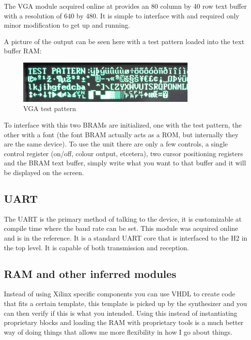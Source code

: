 \documentclass	[a4paper, 10pt]	{article}
\begin{document}
    The VGA module acquired online at \cite{vgacore} provides an 80 column by 40 row text buffer with
    a resolution of 640 by 480. It is simple to interface with and required only minor modification
    to get up and running.

    A picture of the output can be seen here with a test pattern loaded into the text buffer RAM:

      \begin{figure}[ht]
        \centering
        \includegraphics[width=0.8\textwidth]{pic/vga.png}
        \caption{VGA test pattern}
        \label{fig:VGA test pattern}
      \end{figure}
      \FloatBarrier

    To interface with this two BRAMs are initialized, one with the test pattern, the other with
    a font (the font BRAM actually acts as a ROM, but internally they are the same device). To
    use the unit there are only a few controls, a single control register (on/off, colour output,
    etcetera), two cursor positioning registers and the BRAM text buffer, simply write what you
    want to that buffer and it will be displayed on the screen.


    \subsection{UART}

      The UART is the primary method of talking to the device, it is customizable at
      compile time where the baud rate can be set. This module was acquired online
      and is in the reference\cite{uartcore}. It is a standard UART core that is
      interfaced to the H2 in the top level. It is capable of both transmission and
      reception.

    \subsection{RAM and other inferred modules}

      Instead of using Xilinx specific components you can use VHDL to create code that
      fits a certain template, this template is picked up by the synthesizer and you  
      can then verify if this is what you intended. Using this instead of instantiating
      proprietary blocks and loading the RAM with proprietary tools is a much better
      way of doing things that allows me more flexibility in how I go about things.
\end{document}

